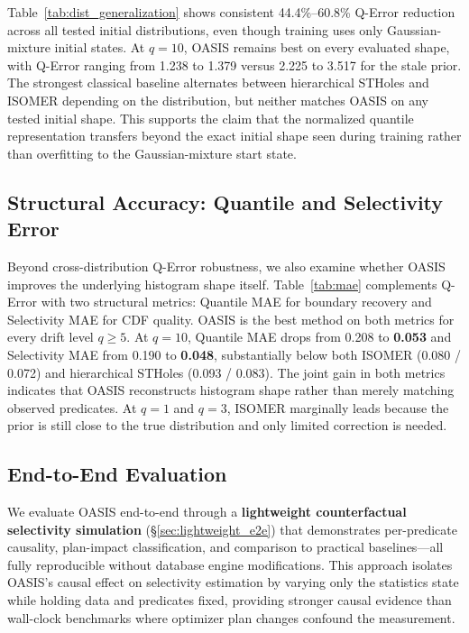 \documentclass[runningheads]{llncs}
\begin{document}


Table~\ref{tab:dist_generalization} shows consistent 44.4\%--60.8\% Q-Error reduction across all tested initial distributions, even though training uses only Gaussian-mixture initial states. At $q{=}10$, OASIS remains best on every evaluated shape, with Q-Error ranging from 1.238 to 1.379 versus 2.225 to 3.517 for the stale prior. The strongest classical baseline alternates between hierarchical STHoles and ISOMER depending on the distribution, but neither matches OASIS on any tested initial shape. This supports the claim that the normalized quantile representation transfers beyond the exact initial shape seen during training rather than overfitting to the Gaussian-mixture start state.

\subsection{Structural Accuracy: Quantile and Selectivity Error}
\label{sec:secondary}

Beyond cross-distribution Q-Error robustness, we also examine whether OASIS improves the underlying histogram shape itself. Table~\ref{tab:mae} complements Q-Error with two structural metrics: Quantile MAE for boundary recovery and Selectivity MAE for CDF quality. OASIS is the best method on both metrics for every drift level $q{\geq}5$. At $q{=}10$, Quantile MAE drops from 0.208 to \textbf{0.053} and Selectivity MAE from 0.190 to \textbf{0.048}, substantially below both ISOMER (0.080 / 0.072) and hierarchical STHoles (0.093 / 0.083). The joint gain in both metrics indicates that OASIS reconstructs histogram shape rather than merely matching observed predicates. At $q{=}1$ and $q{=}3$, ISOMER marginally leads because the prior is still close to the true distribution and only limited correction is needed.


\subsection{End-to-End Evaluation}
\label{sec:tpcds}

We evaluate OASIS end-to-end through a \textbf{lightweight counterfactual selectivity simulation} (\S\ref{sec:lightweight_e2e}) that demonstrates per-predicate causality, plan-impact classification, and comparison to practical baselines---all fully reproducible without database engine modifications. This approach isolates OASIS's causal effect on selectivity estimation by varying only the statistics state while holding data and predicates fixed, providing stronger causal evidence than wall-clock benchmarks where optimizer plan changes confound the measurement.
\end{document}
